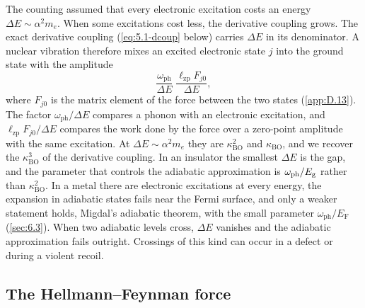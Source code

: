 The counting assumed that every electronic excitation costs an energy $\Delta E \sim \alpha^2m_e$. When some excitations cost less, the derivative coupling grows. The exact derivative coupling (\cref{eq:5.1-dcoup} below) carries $\Delta E$ in its denominator. A nuclear vibration therefore mixes an excited electronic state $j$ into the ground state with the amplitude
\begin{equation}
  \frac{\omega_{\mathrm{ph}}}{\Delta E}\;\frac{\ell_{\mathrm{zp}}F_{j0}}{\Delta E} ,
  \label{eq:5.1-mixing}
\end{equation}
where $F_{j0}$ is the matrix element of the force between the two states (\cref{app:D.13}). The factor $\omega_{\mathrm{ph}}/\Delta E$ compares a phonon with an electronic excitation, and $\ell_{\mathrm{zp}}F_{j0}/\Delta E$ compares the work done by the force over a zero-point amplitude with the same excitation. At $\Delta E \sim \alpha^2m_e$ they are $\kappa_{\mathrm{BO}}^2$ and $\kappa_{\mathrm{BO}}$, and we recover the $\kappa_{\mathrm{BO}}^3$ of the derivative coupling. In an insulator the smallest $\Delta E$ is the gap, and the parameter that controls the adiabatic approximation is $\omega_{\mathrm{ph}}/E_{\mathrm{g}}$ rather than $\kappa_{\mathrm{BO}}^2$. In a metal there are electronic excitations at every energy, the expansion in adiabatic states fails near the Fermi surface, and only a weaker statement holds, Migdal's adiabatic theorem, with the small parameter $\omega_{\mathrm{ph}}/E_{\mathrm{F}}$ (\cref{sec:6.3}). When two adiabatic levels cross, $\Delta E$ vanishes and the adiabatic approximation fails outright. Crossings of this kind can occur in a defect or during a violent recoil.

\subsection{The Hellmann--Feynman force}

